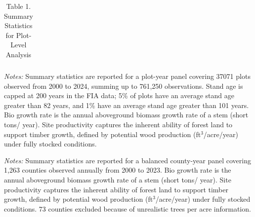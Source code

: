 \documentclass{article}
\begin{document}
\begin{table}[!htbp]
\centering
\caption*{Table 1. Summary Statistics for Plot-Level Analysis}
\begin{tabular}{llllll}
    \midrule

\end{tabular}
\begin{minipage}{\textwidth}
\footnotesize
\textit{Notes:} Summary statistics are reported for a plot-year panel covering  37071 plots observed from 2000 to 2024, summing up to 761,250 observations. 
Stand age is capped at 200 years in the FIA data; 5\% of plots have an average stand age greater than 82 years, and 1\% have an average stand age greater than 101 years.
Bio growth rate is the annual aboveground biomass growth rate of a stem (short tons/ year). 
Site productivity captures the inherent ability of forest land to support timber growth, defined by potential 
wood production (ft$^3$/acre/year) under fully stocked conditions.
\end{minipage}
\end{table}


\begin{table}[!htbp]
\centering
\caption*{Table 2. Summary Statistics for County-Level Analysis}
\begin{minipage}{\textwidth}
\footnotesize
\textit{Notes:} Summary statistics are reported for a balanced county-year panel covering 1,263 counties observed annually from 2000 to 2023.
 Bio growth rate is the annual aboveground biomass growth rate of a stem (short tons/ year). 
Site productivity captures the inherent ability of forest land to support timber growth, defined by potential 
wood production (ft$^3$/acre/year) under fully stocked conditions. 73 counties excluded because of unrealistic trees per acre information.
\end{minipage}
\end{table}
\end{document}
